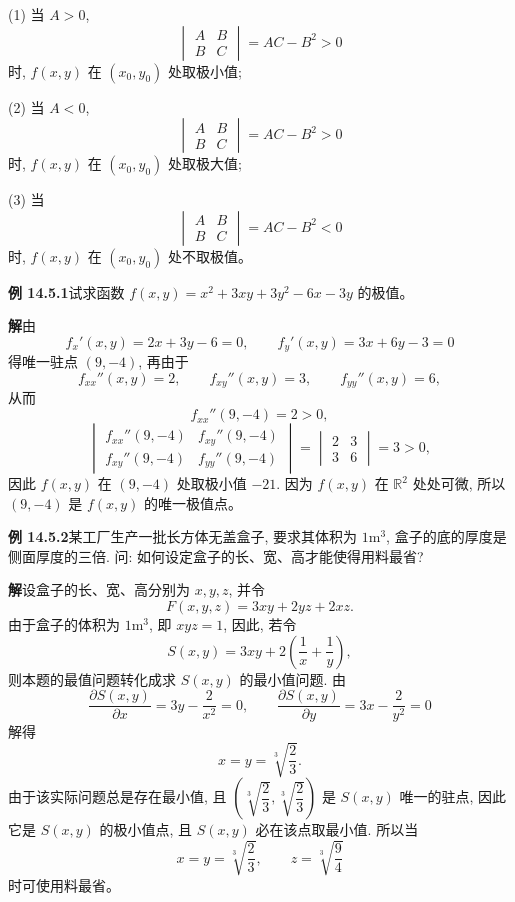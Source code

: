 \documentclass[UTF8, 12pt, fontset=fandol, oneside]{ctexart}
\begin{document}
\noindent (1) 当 $A>0$,
\[
  \begin{vmatrix}
    A & B\\
    B & C
  \end{vmatrix}
  =AC-B^2>0
\]
时, $f(x,y)$ 在 $(x_0,y_0)$ 处取极小值;

\noindent (2) 当 $A<0$,
\[
  \begin{vmatrix}
    A & B\\
    B & C
  \end{vmatrix}
  =AC-B^2>0
\]
时, $f(x,y)$ 在 $(x_0,y_0)$ 处取极大值;

\noindent (3) 当
\[
  \begin{vmatrix}
    A & B\\
    B & C
  \end{vmatrix}
  =AC-B^2<0
\]
时, $f(x,y)$ 在 $(x_0,y_0)$ 处不取极值。

\noindent\textbf{例 14.5.1}\quad 试求函数 $f(x,y)=x^2+3xy+3y^2-6x-3y$ 的极值。

\noindent\textbf{解}\quad 由
\[
  f_x'(x,y)=2x+3y-6=0,\qquad
  f_y'(x,y)=3x+6y-3=0
\]
得唯一驻点 $(9,-4)$, 再由于
\[
  f_{xx}''(x,y)=2,\qquad f_{xy}''(x,y)=3,\qquad f_{yy}''(x,y)=6,
\]
从而
\[
  f_{xx}''(9,-4)=2>0,
\]
\[
  \begin{vmatrix}
    f_{xx}''(9,-4) & f_{xy}''(9,-4)\\
    f_{xy}''(9,-4) & f_{yy}''(9,-4)
  \end{vmatrix}
  =
  \begin{vmatrix}
    2 & 3\\
    3 & 6
  \end{vmatrix}
  =3>0,
\]
因此 $f(x,y)$ 在 $(9,-4)$ 处取极小值 $-21$. 因为 $f(x,y)$ 在 $\mathbb R^2$ 处处可微, 所以 $(9,-4)$ 是 $f(x,y)$ 的唯一极值点。

\noindent\textbf{例 14.5.2}\quad 某工厂生产一批长方体无盖盒子, 要求其体积为 $1\mathrm{m}^3$, 盒子的底的厚度是侧面厚度的三倍. 问: 如何设定盒子的长、宽、高才能使得用料最省?

\noindent\textbf{解}\quad 设盒子的长、宽、高分别为 $x,y,z$, 并令
\[
  F(x,y,z)=3xy+2yz+2xz.
\]
由于盒子的体积为 $1\mathrm{m}^3$, 即 $xyz=1$, 因此, 若令
\[
  S(x,y)=3xy+2\left(\frac1x+\frac1y\right),
\]
则本题的最值问题转化成求 $S(x,y)$ 的最小值问题. 由
\[
  \frac{\partial S(x,y)}{\partial x}=3y-\frac2{x^2}=0,\qquad
  \frac{\partial S(x,y)}{\partial y}=3x-\frac2{y^2}=0
\]
解得
\[
  x=y=\sqrt[3]{\frac23}.
\]
由于该实际问题总是存在最小值, 且 $\left(\sqrt[3]{\dfrac23},\sqrt[3]{\dfrac23}\right)$ 是 $S(x,y)$ 唯一的驻点, 因此它是 $S(x,y)$ 的极小值点, 且 $S(x,y)$ 必在该点取最小值. 所以当
\[
  x=y=\sqrt[3]{\frac23},\qquad z=\sqrt[3]{\frac94}
\]
时可使用料最省。
\end{document}
